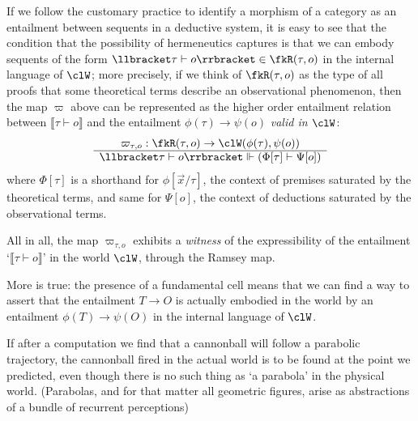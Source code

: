 \begin{remark}
If we follow the customary practice to identify a morphism of a category as an entailment between sequents in a deductive system, it is easy to see that the condition that the possibility of hermeneutics captures is that we can embody sequents of the form $\llbracket \tau\vdash o\rrbracket \in \fkR(\tau,o)$ in the internal language of $\clW$; more precisely, if we think of $\fkR(\tau,o)$ as the type of all proofs that some theoretical terms describe an observational phenomenon, then the map $\varpi$ above can be represented as the higher order entailment relation between $\llbracket \tau\vdash o\rrbracket$ and the entailment $\phi(\tau) \to \psi(o)$ \emph{valid in $\clW$}:
\[ \begin{array}{c}
	\varpi_{\tau,o} : \fkR(\tau,o) \to \clW(\phi(\tau),\psi(o)) \\ \hline 
	\llbracket \tau\vdash o\rrbracket \Vdash (\Phi[\tau] \vdash \Psi[o])
\end{array} \] 
where $\Phi[\tau]$ is a shorthand for $\phi[\vec x/\tau]$, the context of premises saturated by the theoretical terms, and same for $\Psi[o]$, the context of deductions saturated by the observational terms. 
\end{remark}
All in all, the map $\varpi_{\tau,o}$ exhibits a \emph{witness} of the expressibility of the entailment `$\llbracket \tau\vdash o\rrbracket$' in the world $\clW$, through the Ramsey map.

More is true: the presence of a fundamental cell means that we can find a way to assert that the entailment $T\to O$ is actually embodied in the world by an entailment $\phi(T)\to \psi(O)$ in the internal language of $\clW$.

If after a computation we find that a cannonball will follow a parabolic trajectory, the cannonball fired in the actual world is to be found at the point we predicted, even though there is no such thing as `a parabola' in the physical world. (Parabolas, and for that matter all geometric figures, arise as abstractions of a bundle of recurrent perceptions)

